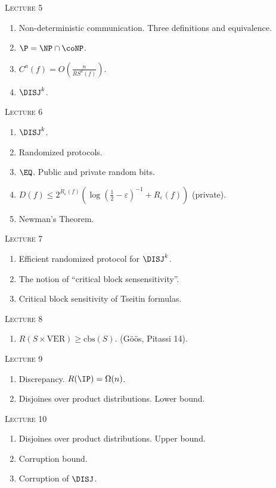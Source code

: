 \centerline{\textsc{Lecture 5}}

\begin{enumerate}
    \item Non-deterministic communication. Three definitions and equivalence.
    \item $\P = \NP \cap \coNP$.
    \item $C^a(f) = O\left(\frac{n}{RS^a(f)}\right)$.
    \item $\DISJ^k$.

\end{enumerate}

\centerline{\textsc{Lecture 6}}

\begin{enumerate}
    \item $\DISJ^k$.
    \item Randomized protocols.
    \item $\EQ$. Public and private random bits.
    \item $D(f) \le 2^{R_{\varepsilon}(f)} \left( \log(\frac{1}{2} - \varepsilon)^{-1} +
        R_{\varepsilon}(f) \right)$ (private).
    \item Newman's Theorem. 
\end{enumerate}



\centerline{\textsc{Lecture 7}}

\begin{enumerate}
    \item Efficient randomized protocol for $\DISJ^k$.
    \item The notion of ``critical block sensensitivity''.
    \item Critical block sensitivity of Tseitin formulas.
\end{enumerate}

\centerline{\textsc{Lecture 8}}

\begin{enumerate}
    \item $R(S \times \mathrm{VER}) \ge \mathrm{cbs}(S)$. (G{\"{o}}{\"{o}}s, Pitassi 14).
\end{enumerate}

\centerline{\textsc{Lecture 9}}

\begin{enumerate}
    \item Discrepancy. $R(\IP) = \Omega(n)$.
    \item Disjoines over product distributions. Lower bound.
\end{enumerate}

\centerline{\textsc{Lecture 10}}

\begin{enumerate}
    \item Disjoines over product distributions. Upper bound.
    \item Corruption bound.
    \item Corruption of $\DISJ$.
\end{enumerate}